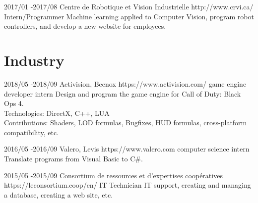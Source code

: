 \documentclass[10pt]{article} %
\begin{document}
\job
{2017/01 -}{2017/08}
{Centre de Robotique et Vision Industrielle}
{http://www.crvi.ca/}
{Intern/Programmer}
{Machine learning applied to Computer Vision, program robot controllers, and develop a new website for employees.}

\section{Industry}

\job
{2018/05 -}{2018/09}
{Activision, Beenox}
{https://www.activision.com/}
{game engine developer intern}
{Design and program the game engine for Call of Duty: Black Ops 4.\\
 Technologies: DirectX, C++, LUA \\
 Contributions: Shaders, LOD formulas, Bugfixes, HUD formulas, cross-platform compatibility, etc.}

\job
{2016/05 -}{2016/09}
{Valero, Levis}
{https://www.valero.com}
{computer science intern}
{Translate programs from Visual Basic to C\#.}

\job
{2015/05 -}{2015/09}
{Consortium de ressources et d'expertises coopératives}
{https://leconsortium.coop/en/}
{IT Technician}
{IT support, creating and managing a database, creating a web site, etc.}





\end{document}
